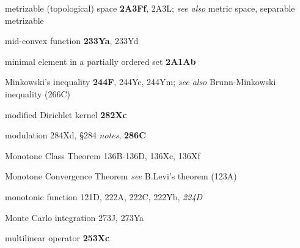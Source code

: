 





metrizable (topological) space {\bf 2A3Ff}, 2A3L; 
  {\it see also} metric space,
separable metrizable













mid-convex function {\bf 233Ya}, 233Yd


minimal element in a partially ordered set {\bf 2A1Ab}


Minkowski's inequality {\bf 244F}, 244Yc, 244Ym;
  {\it see also} Brunn-Minkowski inequality (266C)


















modified Dirichlet kernel {\bf 282Xc}






modulation 284Xd, \S284 {\it notes}, {\bf 286C}




Monotone Class Theorem 136B-136D, 
136Xc, 136Xf

Monotone Convergence Theorem {\it see} B.Levi's theorem (123A)



monotonic function 121D, 222A, 222C, 222Yb, {\it 224D}



Monte Carlo integration 273J, 273Ya




multilinear operator {\bf 253Xc}

















